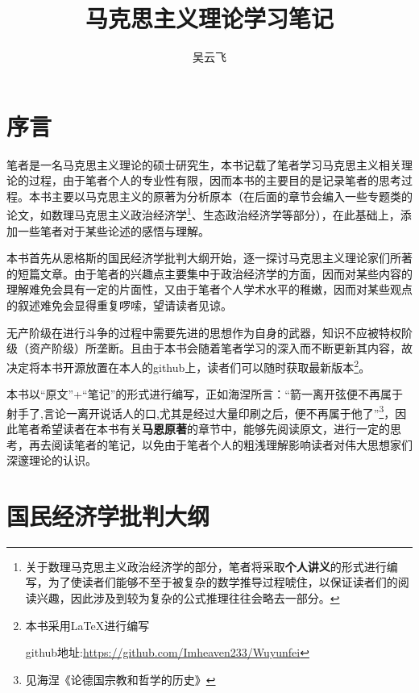 \documentclass[a4paper,twoside,12pt,AutoFakeBold]{ctexart}
\title{马克思主义理论学习笔记}
\author{吴云飞}
\date{}
\begin{document}
\maketitle

\newpage

\tableofcontents

\newpage

\section{序言}
\begin{adjustwidth}{2em}{2em}
\qquad\fangsong 笔者是一名马克思主义理论的硕士研究生，本书记载了笔者学习马克思主义相关理论的过程，由于笔者个人的专业性有限，因而本书的主要目的是记录笔者的思考过程。本书主要以马克思主义的原著为分析原本（在后面的章节会编入一些专题类的论文，如数理马克思主义政治经济学\footnote{关于数理马克思主义政治经济学的部分，笔者将采取\textbf{个人讲义}的形式进行编写，为了使读者们能够不至于被复杂的数学推导过程唬住，以保证读者们的阅读兴趣，因此涉及到较为复杂的公式推理往往会略去一部分。}、生态政治经济学等部分），在此基础上，添加一些笔者对于某些论述的感悟与理解。

本书首先从恩格斯的国民经济学批判大纲开始，逐一探讨马克思主义理论家们所著的短篇文章。由于笔者的兴趣点主要集中于政治经济学的方面，因而对某些内容的理解难免会具有一定的片面性，又由于笔者个人学术水平的稚嫩，因而对某些观点的叙述难免会显得重复啰嗦，望请读者见谅。

无产阶级在进行斗争的过程中需要先进的思想作为自身的武器，知识不应被特权阶级（资产阶级）所垄断。且由于本书会随着笔者学习的深入而不断更新其内容，故决定将本书开源放置在本人的github上，读者们可以随时获取最新版本\footnote{本书采用LaTeX进行编写

\quad github地址:\url{https://github.com/Imheaven233/Wuyunfei}}。

本书以“原文”+“笔记”的形式进行编写，正如海涅所言：“箭一离开弦便不再属于射手了,言论一离开说话人的口,尤其是经过大量印刷之后，便不再属于他了”\footnote{见海涅《论德国宗教和哲学的历史》}，因此笔者希望读者在本书有关\textbf{马恩原著}的章节中，能够先阅读原文，进行一定的思考，再去阅读笔者的笔记，以免由于笔者个人的粗浅理解影响读者对伟大思想家们深邃理论的认识。

\end{adjustwidth}

\newpage

\section{国民经济学批判大纲}
\end{document}
